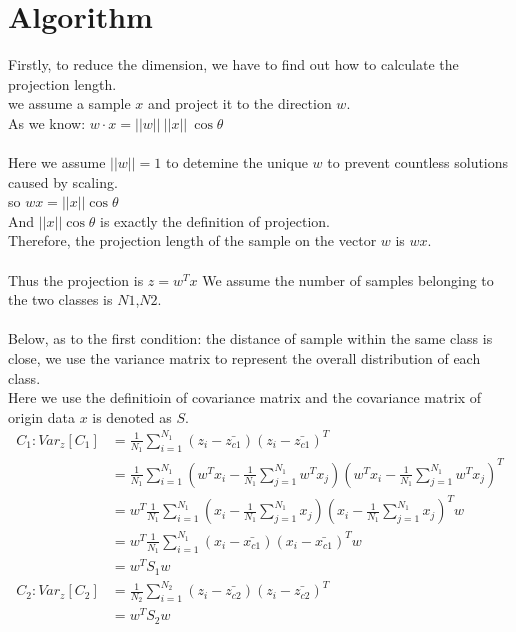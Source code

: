 \documentclass{report}
\begin{document}
\section{Algorithm}
Firstly, to reduce the dimension, we have to find out how to calculate the projection length.\\
we assume a sample $x$ and project it to the direction $w$.\\
As we know: $w\cdot x=||w||\ ||x||\ \cos{\theta}$\\\\
Here we assume $||w||=1$ to detemine the unique $w$ to prevent countless solutions caused by scaling.\\
so $w x=||x||\cos{\theta}$\\
And $||x||\cos{\theta}$ is exactly the definition of projection.\\
Therefore, the projection length of the sample on the vector $w$ is $wx$.\\\\
Thus the projection is $z=w^T x$
We assume the number of samples belonging to the two classes is $N1$,$N2$.\\\\
Below, as to the first condition: the distance of sample within the same class is close, we use the variance matrix to represent the overall distribution of each class.\\
Here we use the definitioin of covariance matrix and the covariance matrix of origin data $x$ is denoted as $S$.\\
\begin{equation}
\begin{aligned}C_1: Var_z[C_1]&=\frac{1}{N_1}\sum_{i=1}^{N_1} (z_i-\bar{z_{c1}})(z_i-\bar{z_{c1}})^T\\
&=\frac{1}{N_1}\sum_{i=1}^{N_1}(w^T x_i-\frac{1}{N_1}\sum_{j=1}^{N_1}w^T x_j)(w^T x_i-\frac{1}{N_1}\sum_{j=1}^{N_1}w^T x_j)^T \\&=w^T \frac{1}{N_1}\sum_{i=1}^{N_1}(x_i-\frac{1}{N_1}\sum_{j=1}^{N_1} x_j)(x_i-\frac{1}{N_1}\sum_{j=1}^{N_1} x_j)^T w\\&=w^{T} \frac{1}{N_{1}} \sum_{i=1}^{N_{1}}\left(x_{i}-\bar{x_{c 1}}\right)\left(x_{i}-\bar{x_{c 1}}\right)^{T} w\\&=w^T S_1 w\\C_2: Var_z[C_2]&=\frac{1}{N_2}\sum_{i=1}^{N_2} (z_i-\bar{z_{c2}})(z_i-\bar{z_{c2}})^T\\&=w^T S_2 w
\end{aligned}
\end{equation}
\end{document}
